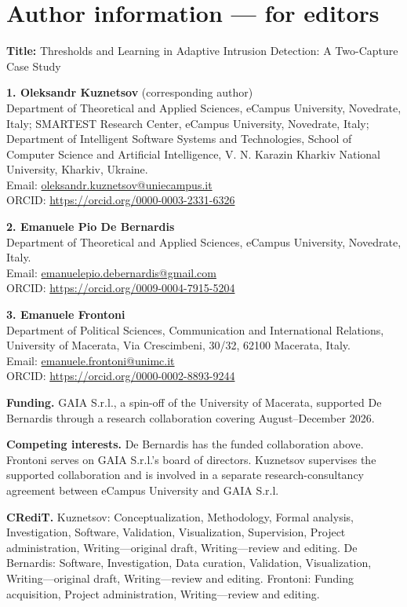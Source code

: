 \documentclass[11pt]{article}
\begin{document}
\clearpage
\section*{Author information --- for editors}
\textbf{Title:} Thresholds and Learning in Adaptive Intrusion Detection: A Two-Capture Case Study

\textbf{1. Oleksandr Kuznetsov} (corresponding author)\\
Department of Theoretical and Applied Sciences, eCampus University, Novedrate, Italy; SMARTEST Research Center, eCampus University, Novedrate, Italy; Department of Intelligent Software Systems and Technologies, School of Computer Science and Artificial Intelligence, V. N. Karazin Kharkiv National University, Kharkiv, Ukraine.\\
Email: \href{mailto:oleksandr.kuznetsov@uniecampus.it}{oleksandr.kuznetsov@uniecampus.it}\\
ORCID: \url{https://orcid.org/0000-0003-2331-6326}

\textbf{2. Emanuele Pio De Bernardis}\\
Department of Theoretical and Applied Sciences, eCampus University, Novedrate, Italy.\\
Email: \href{mailto:emanuelepio.debernardis@gmail.com}{emanuelepio.debernardis@gmail.com}\\
ORCID: \url{https://orcid.org/0009-0004-7915-5204}

\textbf{3. Emanuele Frontoni}\\
Department of Political Sciences, Communication and International Relations, University of Macerata, Via Crescimbeni, 30/32, 62100 Macerata, Italy.\\
Email: \href{mailto:emanuele.frontoni@unimc.it}{emanuele.frontoni@unimc.it}\\
ORCID: \url{https://orcid.org/0000-0002-8893-9244}

\textbf{Funding.} GAIA S.r.l., a spin-off of the University of Macerata, supported De Bernardis through a research collaboration covering August--December 2026.

\textbf{Competing interests.} De Bernardis has the funded collaboration above. Frontoni serves on GAIA S.r.l.'s board of directors. Kuznetsov supervises the supported collaboration and is involved in a separate research-consultancy agreement between eCampus University and GAIA S.r.l.

\textbf{CRediT.} Kuznetsov: Conceptualization, Methodology, Formal analysis, Investigation, Software, Validation, Visualization, Supervision, Project administration, Writing---original draft, Writing---review and editing. De Bernardis: Software, Investigation, Data curation, Validation, Visualization, Writing---original draft, Writing---review and editing. Frontoni: Funding acquisition, Project administration, Writing---review and editing.
\end{document}
